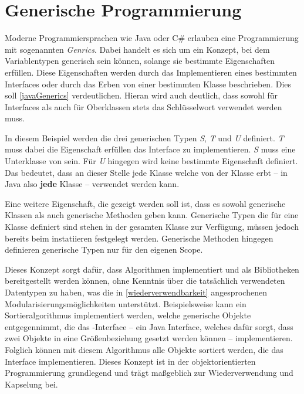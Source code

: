 \section{Generische Programmierung}
Moderne Programmiersprachen wie Java oder C\# erlauben eine Programmierung mit sogenannten \textit{Genrics}. Dabei handelt es sich um ein Konzept, bei dem Variablentypen generisch sein können, solange sie bestimmte Eigenschaften erfüllen. Diese Eigenschaften werden durch das Implementieren eines bestimmten Interfaces oder durch das Erben von einer bestimmten Klasse beschrieben. Dies soll \autoref{javaGenerics} verdeutlichen. Hieran wird auch deutlich, dass sowohl für Interfaces als auch für Oberklassen stets das Schlüsselwort  verwendet werden muss.


In diesem Beispiel werden die drei generischen Typen \textit{S}, \textit{T} und \textit{U} definiert. \textit{T} muss dabei die Eigenschaft erfüllen das  Interface zu implementieren. \textit{S} muss eine Unterklasse von  sein. Für \textit{U} hingegen wird keine bestimmte Eigenschaft definiert. Das bedeutet, dass an dieser Stelle jede Klasse welche von der Klasse  erbt -- in Java also \textbf{jede} Klasse -- verwendet werden kann. 

Eine weitere Eigenschaft, die gezeigt werden soll ist, dass es sowohl generische Klassen als auch generische Methoden geben kann. Generische Typen die für eine Klasse definiert sind stehen in der gesamten Klasse zur Verfügung, müssen jedoch bereits beim instatiieren festgelegt werden. Generische Methoden hingegen definieren generische Typen nur für den eigenen Scope.

Dieses Konzept sorgt dafür, dass Algorithmen implementiert und als Bibliotheken bereitgestellt werden können, ohne Kenntnis über die tatsächlich verwendeten Datentypen zu haben, was die in \autoref{wiederverwendbarkeit} angesprochenen Modularisierungsmöglichkeiten unterstützt. Beispielsweise kann ein Sortieralgorithmus implementiert werden, welche generische Objekte entgegennimmt, die das -Interface -- ein Java Interface, welches dafür sorgt, dass zwei Objekte in eine Größenbeziehung gesetzt werden können -- implementieren. Folglich können mit diesem Algorithmus alle Objekte sortiert werden, die das Interface implementieren. Dieses Konzept ist in der objektorientierten Programmierung grundlegend und trägt maßgeblich zur Wiederverwendung und Kapselung bei.